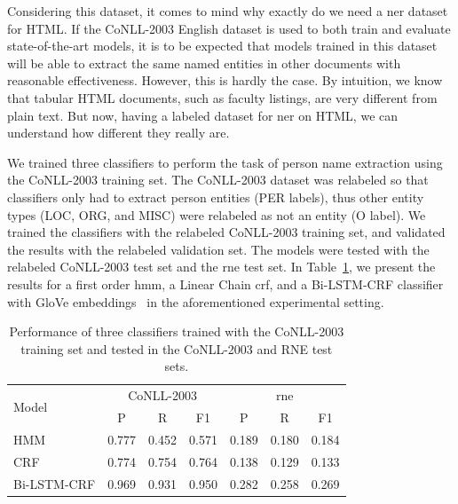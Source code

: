 \documentclass{nle}
\begin{document}
Considering this dataset, it comes to mind why exactly do we need a \gls{ner} dataset for HTML. 
If the {CoNLL-2003} English dataset is used to both train and evaluate 
state-of-the-art models, it is to be expected that models trained in this dataset will
be able to extract the same named entities in other documents with reasonable 
effectiveness. However, this is hardly the case. By intuition, we know that tabular HTML 
documents, such as faculty listings, are very different from plain text. But now, having a
labeled dataset for \gls{ner} on HTML, we can understand how different they really are.

We trained three classifiers to perform the task of person name extraction using
the {CoNLL-2003} training set. The {CoNLL-2003} dataset was relabeled so that classifiers only had to extract
person entities (PER labels), thus other entity types (LOC, ORG, and MISC) were relabeled as
not an entity (O label). We trained the classifiers with the relabeled {CoNLL-2003} training set,
and validated the results with the relabeled validation set. The models were tested with the relabeled {CoNLL-2003}
test set and the \gls{rne} test set.
In Table~\ref{tab:conll_to_ner_on_html}, we present the results for a first order \gls{hmm}, 
a Linear Chain \gls{crf}, and a Bi-LSTM-CRF classifier with GloVe embeddings~\cite{Huang2015} in the 
aforementioned experimental setting.

\begin{table}[h]
  \small
  \begin{center}
    \begin{tabular}{ lllllll }
      \toprule
      \multirow{2}{*}{Model} & \multicolumn{3}{c}{CoNLL-2003} & \multicolumn{3}{c}{\gls{rne}} \\
                             & \multicolumn{1}{c}{P} & \multicolumn{1}{c}{R} & \multicolumn{1}{c}{F1}
                             & \multicolumn{1}{c}{P} & \multicolumn{1}{c}{R} & \multicolumn{1}{c}{F1} \\
      \midrule
      HMM         & 0.777 & 0.452 & 0.571 & 0.189 & 0.180 & 0.184 \\
      CRF         & 0.774 & 0.754 & 0.764 & 0.138 & 0.129 & 0.133 \\
      Bi-LSTM-CRF & 0.969 & 0.931 & 0.950 & 0.282 & 0.258 & 0.269 \\
      \bottomrule
    \end{tabular}
  \end{center}
  \caption{
    Performance of three classifiers trained with the {CoNLL-2003} training set and tested in
    the CoNLL-2003 and RNE test sets.
  }
  \label{tab:conll_to_ner_on_html}
\end{table}
\end{document}
